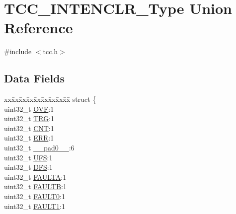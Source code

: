 \hypertarget{union_t_c_c___i_n_t_e_n_c_l_r___type}{}\section{T\+C\+C\+\_\+\+I\+N\+T\+E\+N\+C\+L\+R\+\_\+\+Type Union Reference}
\label{union_t_c_c___i_n_t_e_n_c_l_r___type}


{\ttfamily \#include $<$tcc.\+h$>$}

\subsection*{Data Fields}
\begin{DoxyCompactItemize}
\item 
\begin{tabbing}
xx\=xx\=xx\=xx\=xx\=xx\=xx\=xx\=xx\=\kill
struct \{\\
\>uint32\_t \mbox{\hyperlink{union_t_c_c___i_n_t_e_n_c_l_r___type_ab2e0ce4821f085dd64eac381d127a279}{OVF}}:1\\
\>uint32\_t \mbox{\hyperlink{union_t_c_c___i_n_t_e_n_c_l_r___type_a379eb3005146131648b84a34bee461ba}{TRG}}:1\\
\>uint32\_t \mbox{\hyperlink{union_t_c_c___i_n_t_e_n_c_l_r___type_a6fca6863f3eb037bb9f776358c88d2be}{CNT}}:1\\
\>uint32\_t \mbox{\hyperlink{union_t_c_c___i_n_t_e_n_c_l_r___type_a9d1c4a40e59f012352b155a316d2e65e}{ERR}}:1\\
\>uint32\_t \mbox{\hyperlink{union_t_c_c___i_n_t_e_n_c_l_r___type_a3e57c2ef1c3ffb36722f000cc1156824}{\_\_pad0\_\_}}:6\\
\>uint32\_t \mbox{\hyperlink{union_t_c_c___i_n_t_e_n_c_l_r___type_a1654bab1cafc8412acbb76e3af548f8c}{UFS}}:1\\
\>uint32\_t \mbox{\hyperlink{union_t_c_c___i_n_t_e_n_c_l_r___type_a19b07df6dae8764d8f1f27de4d839308}{DFS}}:1\\
\>uint32\_t \mbox{\hyperlink{union_t_c_c___i_n_t_e_n_c_l_r___type_ac84d9325556a175dc2d3e1b130fd64d2}{FAULTA}}:1\\
\>uint32\_t \mbox{\hyperlink{union_t_c_c___i_n_t_e_n_c_l_r___type_a577317590264c8a0c46f0673ff5e8b19}{FAULTB}}:1\\
\>uint32\_t \mbox{\hyperlink{union_t_c_c___i_n_t_e_n_c_l_r___type_a6b1fb8678950bda06a28a5684ea94c8f}{FAULT0}}:1\\
\>uint32\_t \mbox{\hyperlink{union_t_c_c___i_n_t_e_n_c_l_r___type_a6c5fa32e277485faac1a6b29747666f7}{FAULT1}}:1\\

\end{tabbing}
\end{DoxyCompactItemize}
